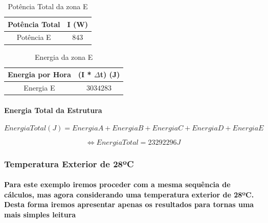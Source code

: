 \documentclass[12pt, a4paper]{article}
\begin{document}
\vspace{30mm}

\begin{table}[htpb]
	\begin{center}
		\begin{tabular}{c c}
			\toprule
			Potência  Total 										 & 	I (W) \\
			\midrule
			 Potência E		               	     & $843$	 \\
			\bottomrule
		\end{tabular}
	\end{center}
	\caption{Potência Total da zona E}\label{tab:2seccaoEpotT}
\end{table}

\vspace{30mm}

\begin{table}[htpb]
	\begin{center}
		\begin{tabular}{c c}
			\toprule
			Energia por Hora 								 & 	(I * $\Delta$t) (J) \\
			\midrule
			Energia E 						               	     & $3034283$	 \\
			\bottomrule
		\end{tabular}
	\end{center}
	\caption{Energia da zona E}\label{tab:3seccaoEpotT}
\end{table}


\pagebreak
\paragraph{Energia Total da Estrutura}

\begin{equation}
	Energia Total(J) = Energia A + Energia B + Energia C + Energia D + Energia E
	\label{eq:1totalEnergia}
\end{equation}

\begin{equation}
	\Leftrightarrow Energia Total = 	23292296 J
	\label{eq:2totalEnergiaR}
\end{equation}

\subsubsection{Temperatura Exterior de 28ºC}
\paragraph{Para este exemplo iremos proceder com a mesma sequência de cálculos, mas agora considerando uma temperatura exterior de 28ºC. Desta forma iremos apresentar apenas os resultados para tornas uma mais simples leitura}
\end{document}
